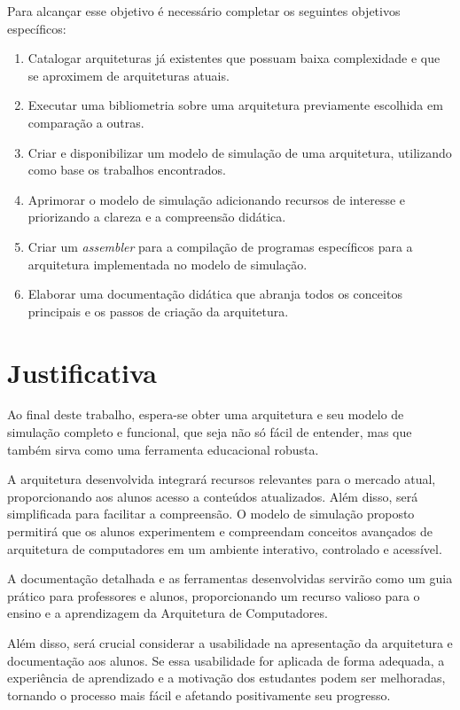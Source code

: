 \documentclass[
	12pt,				%
	openright,			%
	oneside,			%
	a4paper,			%
	english,			%
	french,				%
	spanish,			%
	brazil,				%
	]{abntex2}
\begin{document}
Para alcançar esse objetivo é necessário completar os seguintes objetivos específicos:
\begin{enumerate}[label=\textbf{O\arabic*-}]
    \item Catalogar arquiteturas já existentes que possuam baixa complexidade e que se aproximem de arquiteturas atuais.
    \item Executar uma bibliometria sobre uma arquitetura previamente escolhida em comparação a outras.
    \item Criar e disponibilizar um modelo de simulação de uma arquitetura, utilizando como base os trabalhos encontrados.
    \item Aprimorar o modelo de simulação adicionando recursos de interesse e priorizando a clareza e a compreensão didática.
    \item Criar um \textit{assembler} para a compilação de programas específicos para a arquitetura implementada no modelo de simulação.
    \item Elaborar uma documentação didática que abranja todos os conceitos principais e os passos de criação da arquitetura.
\end{enumerate}

\section{Justificativa}
Ao final deste trabalho, espera-se obter uma arquitetura e seu modelo de simulação completo e funcional, que seja não só fácil de entender, mas que também sirva como uma ferramenta educacional robusta.

A arquitetura desenvolvida integrará recursos relevantes para o mercado atual, proporcionando aos alunos acesso a conteúdos atualizados. Além disso, será simplificada para facilitar a compreensão. O modelo de simulação proposto permitirá que os alunos experimentem e compreendam conceitos avançados de arquitetura de computadores em um ambiente interativo, controlado e acessível. 

A documentação detalhada e as ferramentas desenvolvidas servirão como um guia prático para professores e alunos, proporcionando um recurso valioso para o ensino e a aprendizagem da Arquitetura de Computadores.

Além disso, será crucial considerar a usabilidade na apresentação da arquitetura e documentação aos alunos. Se essa usabilidade for aplicada de forma adequada, a experiência de aprendizado e a motivação dos estudantes podem ser melhoradas, tornando o processo mais fácil e afetando positivamente seu progresso.\cite{dimitrijevic_usability_2020}
\end{document}
